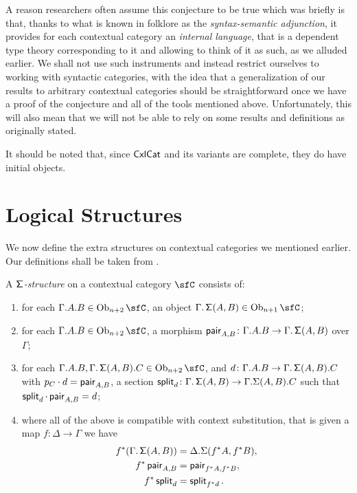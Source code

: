 \begin{rmk}
A reason researchers often assume this conjecture to be true which was briefly
is that, thanks to what is known in folklore as the \emph{syntax-semantic
adjunction}, it provides for each contextual category an \emph{internal
language}, that is a dependent type theory corresponding to it and allowing to
think of it as such, as we alluded earlier. We shall not use such instruments
and instead restrict ourselves to working with syntactic categories, with the
idea that a generalization of our results to arbitrary contextual categories
should be straightforward once we have a proof of the conjecture and all of the
tools mentioned above. Unfortunately,
this will also mean that we will not be able to rely on some results and
definitions as originally stated.
\end{rmk}

\begin{rmk}
It should be noted that, since $\operatorname{\mathsf{CxlCat}}$ and its variants are complete, they do
have initial objects.
\end{rmk}

\section{Logical Structures}

We now define the extra structures on contextual categories we mentioned
earlier. Our definitions shall be taken from \cite{KL12,KL18}.

\begin{defn}
  A \emph{$\operatorname{\mathsf{\Sigma}}$-structure} on a contextual category $\sfC$ consists of:
  \begin{enumerate}
    \item for each $\Gamma.A.B\in\Ob_{n+2}\sfC$, an object
      $\Gamma.\Sigmas(A,B)\in\Ob_{n+1}\sfC$;
    \item for each $\Gamma.A.B\in\Ob_{n+2}\sfC$, a morphism $\operatorname{\mathsf{pair}}_{A,B}\colon
      \Gamma.A.B\rightarrow\Gamma.\operatorname{\mathsf{\Sigma}}(A,B)$ over $\Gamma$;
    \item for each $\Gamma.A.B,\Gamma.\Sigmas(A,B).C\in\Ob_{n+2}\sfC$, and
      $d\colon\Gamma.A.B\rightarrow\Gamma.\operatorname{\mathsf{\Sigma}}(A,B).C$ with $p_C\cdot
      d=\operatorname{\mathsf{pair}}_{A,B}$, a section
      $\operatorname{\mathsf{split}}_d\colon\Gamma.\operatorname{\mathsf{\Sigma}}(A,B)\rightarrow\Gamma.\Sigma(A,B).C$ such
      that $\operatorname{\mathsf{split}}_d\cdot\operatorname{\mathsf{pair}}_{A,B}=d$;
    \item where all of the above is compatible with context substitution, that
      is given a map $f\colon\Delta\rightarrow\Gamma$ we have
      \begin{align*}
        f^*(\Gamma.\operatorname{\mathsf{\Sigma}}(A,B)) &=\Delta.\Sigma(f^*A,f^*B), \\
        f^*\operatorname{\mathsf{pair}}_{A,B} &=\operatorname{\mathsf{pair}}_{f^*A,f^*B}, \\
        f^*\operatorname{\mathsf{split}}_d &=\operatorname{\mathsf{split}}_{f^*d}.
      \end{align*}
  \end{enumerate}
\end{defn}

